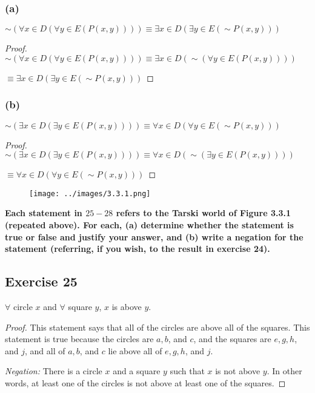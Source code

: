 \documentclass[14pt]{extarticle}
\newcommand{\fa}{\forall}
\newcommand{\te}{\exists}
\begin{document}
\subsubsection{(a)}
$\sim(\fa x \in D(\fa y \in E(P(x, y)))) \equiv \te x \in D(\te y \in E({\sim P(x, y)}))$

\begin{proof}
    ${\sim (\fa x \in D(\fa y \in E(P(x, y))))} \equiv \te x \in D({\sim (\fa y \in E(P(x, y)))})$

    $\equiv \te x \in D(\te y \in E({\sim P(x, y)}))$
\end{proof}

\subsubsection{(b)}
$\sim(\te x \in D(\te y \in E(P(x, y)))) \equiv \fa x \in D(\fa y \in E({\sim P(x, y)}))$

\begin{proof}
    ${\sim (\te x \in D(\te y \in E(P(x, y))))} \equiv \fa x \in D({\sim (\te y \in E(P(x, y)))})$

    $\equiv \fa x \in D(\fa y \in E({\sim P(x, y)}))$
\end{proof}

\begin{figure}[ht!]
    \centering
    \texttt{[image: ../images/3.3.1.png]}
\end{figure}

{\bf \color{cyan} Each statement in $25-28$ refers to the Tarski world of Figure 3.3.1 (repeated above). For each, (a) determine whether the statement is true or false and justify your answer, and (b) write a negation for the statement (referring, if you wish, to the result in exercise 24).}

\subsection{Exercise 25}
$\fa$ circle $x$ and $\fa$ square $y$, $x$ is above $y$.

\begin{proof}
    This statement says that all of the circles are above all of the squares. This statement is true because the circles are $a, b$, and $c$, and the squares are $e, g, h$, and $j$, and all of $a, b$, and $c$ lie above all of $e, g, h$, and $j$.

        {\it Negation:} There is a circle $x$ and a square $y$ such that $x$ is not above $y$. In other words, at least one of the circles is not above at least one of the squares.
\end{proof}
\end{document}
